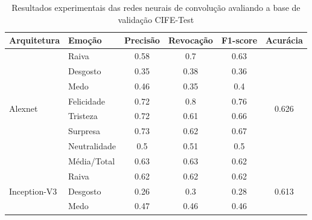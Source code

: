 \begin{table}[]
\centering
\caption{Resultados experimentais das redes neurais de convolução avaliando a base de validação CIFE-Test}
\label{table:cife-test}
\begin{tabular}{llcccc}
\hline
\textbf{Arquitetura}                   & \textbf{Emoção}       & \textbf{Precisão} & \textbf{Revocação} & \textbf{F1-score} & \textbf{Acurácia}               \\ \hline
\multirow{8}{*}{Alexnet}         & Raiva                 & 0.58              & 0.7                & 0.63              & \multirow{8}{*}{0.626}          \\
                                       & Desgosto              & 0.35              & 0.38               & 0.36              &                                 \\
                                       & Medo                  & 0.46              & 0.35               & 0.4               &                                 \\
                                       & Felicidade            & 0.72              & 0.8                & 0.76              &                                 \\
                                       & Tristeza              & 0.72              & 0.61               & 0.66              &                                 \\
                                       & Surpresa              & 0.73              & 0.62               & 0.67              &                                 \\
                                       & Neutralidade          & 0.5               & 0.51               & 0.5               &                                 \\
                                       & Média/Total           & 0.63              & 0.63               & 0.62              &                                 \\ \hline
\multirow{8}{*}{Inception-V3}     & Raiva                 & 0.62              & 0.62               & 0.62              & \multirow{8}{*}{0.613}          \\
                                       & Desgosto              & 0.26              & 0.3                & 0.28              &                                 \\
                                       & Medo                  & 0.47              & 0.46               & 0.46              &                                 \\

\end{tabular}
\end{table}
